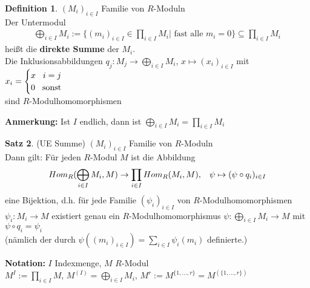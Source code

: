 \documentclass[10pt,a4paper,numbers=endperiod]{scrreprt}
\theoremstyle{definition}
\newtheorem{satz}{Satz}[section]
\newtheorem{defi}[satz]{Definition}
\begin{document}
\begin{defi}
	$(M_i)_{i \in I}$ Familie von $R$-Moduln\\
	Der Untermodul
	\begin{align*}
		\bigoplus\limits_{i \in I} M_i := \{(m_i)_{i \in I} \in \prod\limits_{i \in I} M_i | \text{ fast alle } m_i = 0\} \subseteq \prod\limits_{i \in I} M_i
	\end{align*}
	heißt die \textbf{direkte Summe} der $M_i$.\\
	Die Inklusionsabbildungen $q_j: M_j \rightarrow \bigoplus\limits_{i \in I} M_i$, $x \mapsto (x_i)_{i \in I}$ mit $x_i = \begin{cases}
	 x \hspace{3mm} i = j\\
	 0 \hspace{3mm} \text{sonst}
	\end{cases}$\\
	sind $R$-Modulhomomorphismen
\end{defi}

\textbf{Anmerkung:} Ist $I$ endlich, dann ist $\bigoplus\limits_{i \in I} M_i = \prod\limits_{i \in I} M_i$

\begin{satz}
	(UE Summe) $(M_i)_{i \in I}$ Familie von $R$-Moduln\\
	Dann gilt: Für jeden $R$-Modul $M$ ist die Abbildung
	\begin{align*}
	Hom_R(\bigoplus\limits_{i \in I} M_i, M) \rightarrow \prod\limits_{i \in I} Hom_R(M_i, M), \hspace{3mm} \psi \mapsto (\psi \circ q_i)_{i \in I} 
	\end{align*}
	eine Bijektion, d.h. für jede Familie $(\psi_i)_{i \in I}$ von $R$-Modulhomomorphismen $\psi_i: M_i \rightarrow M$ existiert genau ein $R$-Modulhomomorphismus $\psi: \bigoplus\limits_{i \in I} M_i \rightarrow M$ mit $\psi \circ q_i = \psi_i$\\
	(nämlich der durch $\psi((m_i)_{i \in I}) = \sum\limits_{i \in I} \psi_i(m_i)$ definierte.)
\end{satz}

\textbf{Notation:} $I$ Indexmenge, $M$ $R$-Modul\\
$M^I := \prod_{i \in I} M$, $M^{(I)} = \bigoplus\limits_{i \in I} M_i$, $M^r := M^{\{1, \ldots, r\}} = M^{(\{1, \ldots, r\})}$
\end{document}
